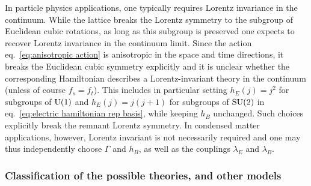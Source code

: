 In particle physics applications, one typically requires Lorentz invariance in the continuum.
While the lattice breaks the Lorentz symmetry to the subgroup of Euclidean cubic rotations, as long as this subgroup is preserved one expects to recover Lorentz invariance in the continuum limit.
Since the action eq.~\eqref{eq:anisotropic action} is anisotropic in the space and time directions, it breaks the Euclidean cubic symmetry explicitly and it is unclear whether the corresponding Hamiltonian describes a Lorentz-invariant theory in the continuum (unless of course $f_s=f_t$).
This includes in particular setting $h_E(j)=j^2$ for subgroups of $\mathrm{U}(1)$ and $h_E(j)=j(j+1)$ for subgroups of $\text{SU}(2)$ in eq.~\eqref{eq:electric hamiltonian rep basis}, while keeping $h_B$ unchanged.
Such choices explicitly break the remnant Lorentz symmetry.
In condensed matter applications, however, Lorentz invariant is not necessarily required and one may thus independently choose $\Gamma$ and $h_B$, as well as the couplings $\lambda_E$ and $\lambda_B$.


\subsubsection{Classification of the possible theories, and other models}\label{sec:classification}

